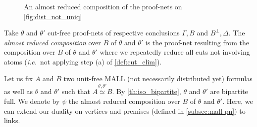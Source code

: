 \documentclass{lmcs}
\newcommand*{\orth}{^\perp} %
\newenvironment{myscopec}[1]{
\begin{scope}[every node/.style={circle,thick,draw=#1,minimum size=8mm,inner sep=0}, every edge/.style={->,draw=#1,thick}, every path/.style={draw=#1, thick}]
\color{#1}
}{
\end{scope}
}
\newenvironment{myscope_sur}{
\begin{scope}[every edge/.style={-,draw=blue,thick,dashed,line width=2.5pt}, every path/.style={-,draw=blue,thick,dashed,line width=2.5pt}]
}{
\end{scope}
}
\newcommand*{\ie}{\emph{i.e.}}
\newcommand*{\iso}{\mathrel{\simeq}} %
\newcommand{\isoproofs}[4]{\overset{\ensuremath{#3,#4}}{#1\iso #2}}
\begin{document}
\begin{figure}
\begin{adjustbox}{}
\end{adjustbox}
\caption{An almost reduced composition of the proof-nets on \autoref{fig:dist_not_uniq}}
\label{fig:dist_not_uniq_comp_red}
\end{figure}

\begin{defi}
\label{def:almost_reduced}
Take $\theta$ and $\theta'$ cut-free proof-nets of respective conclusions $\Gamma,B$ and $B\orth,\Delta$.
The \emph{almost reduced composition} over $B$ of $\theta$ and $\theta'$ is the proof-net resulting from the composition over $B$ of $\theta$ and $\theta'$ where we repeatedly reduce all cuts not involving atoms (\ie\ not applying step (a) of \autoref{def:cut_elim}).
\end{defi}

Let us fix $A$ and $B$ two unit-free MALL (not necessarily distributed yet) formulas as well as $\theta$ and $\theta'$ such that $\isoproofs{A}{B}{\theta}{\theta'}$.
By \autoref{th:iso_bipartite}, $\theta$ and $\theta'$ are bipartite full.
We denote by $\psi$ the almost reduced composition over $B$ of $\theta$ and $\theta'$.
Here, we can extend our duality on vertices and premises (defined in \autoref{subsec:mall-pn}) to links.
\end{document}
